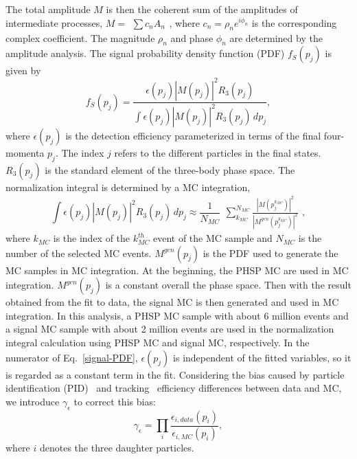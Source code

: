 {The total amplitude $M$ is then the coherent sum of the amplitudes of intermediate processes, $M=\begin{matrix}\sum c_{n}A_{n}\end{matrix}$, where $c_{n}=\rho_{n}e^{i\phi_{n}}$ is the corresponding complex coefficient. The magnitude $\rho_{n}$ and phase $\phi_{n}$ are determined by the amplitude analysis. 
    The signal probability density function (PDF) $f_{S}(p_{j})$ is given by 
    \begin{equation}
        f_{S}(p_{j}) = \frac{\epsilon(p_{j})\left|M(p_{j})\right|^{2}R_{3}(p_{j})}{\int \epsilon(p_{j})\left|M(p_{j})\right|^{2}R_{3}(p_{j})\,dp_{j}}, \label{signal-PDF}
    \end{equation}
    where $\epsilon(p_{j})$ is the detection efficiency parameterized in terms of the final four-momenta $p_{j}$. The index $j$ refers to the different particles in the final states. 
    $R_{3}(p_{j})$ is the standard element of the three-body phase space. 
    The normalization integral is determined by a MC integration,
    \begin{equation}
    \int \epsilon(p_{j})\left|M(p_{j})\right|^{2}R_{3}(p_{j})\,dp_{j} \approx \frac{1}{N_{MC}} \begin{matrix}\sum_{k_{MC}}^{N_{MC}} \frac{\left|M(p_{j}^{k_{MC}})\right|^{2}}{\left|M^{gen}(p_{j}^{k_{MC}})\right|^{2}}\end{matrix}, \label{MC-intergral}
    \end{equation}
    where $k_{MC}$ is the index of the $k_{MC}^{th}$ event of the MC sample and $N_{MC}$ is the number of the selected MC events.  
    $M^{gen}(p_{j})$ is the PDF used to generate the MC samples in MC integration.
    At the beginning, the PHSP MC are used in MC integration. $M^{gen}(p_{j})$ is a constant overall the phase space.
    Then with the result obtained from the fit to data, the signal MC is then generated and used in MC integration.
    In this analysis, a PHSP MC sample with about 6 million events and  a signal MC sample with about 2 million events are used in the normalization integral calculation using PHSP MC and signal MC, respectively.
    In the numerator of Eq.~\ref{signal-PDF}, $\epsilon(p_{j})$ is independent of the fitted variables, so it is regarded as a constant term in the fit.
    Considering the bias caused by particle identification (PID)~\cite{PID} and tracking~\cite{Tracking} efficiency differences between data and MC, we introduce $\gamma_{\epsilon}$ to correct this bias:
    \begin{equation}
        \gamma_{\epsilon} = \prod_{i} \frac{\epsilon_{i, data}(p_{i})}{\epsilon_{i, MC}(p_{i})}, \label{experimental-effect}
    \end{equation}
    where $i$ denotes the three daughter particles. 

}
